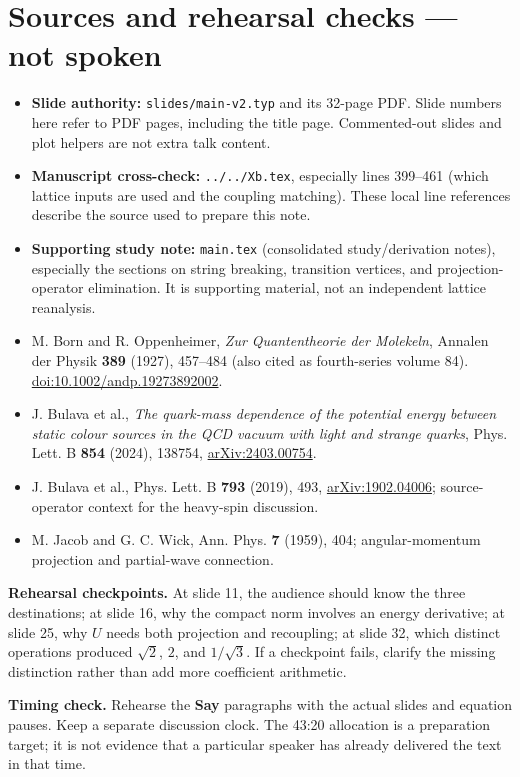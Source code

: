 \documentclass[11pt,a4paper]{article}
\begin{document}
\section*{Sources and rehearsal checks --- not spoken}
\begin{itemize}
\item \textbf{Slide authority:} \texttt{slides/main-v2.typ} and its 32-page
PDF. Slide numbers here refer to PDF pages, including the title page.
Commented-out slides and plot helpers are not extra talk content.
\item \textbf{Manuscript cross-check:} \texttt{../../Xb.tex}, especially
lines 399--461 (which lattice inputs are used and the coupling matching).
These local line references describe the source used to prepare this note.
\item \textbf{Supporting study note:} \texttt{main.tex} (consolidated study/derivation notes),
especially the sections on string breaking, transition vertices, and
projection-operator elimination. It is supporting material, not an
independent lattice reanalysis.
\item M. Born and R. Oppenheimer, \emph{Zur Quantentheorie der Molekeln},
Annalen der Physik \textbf{389} (1927), 457--484
(also cited as fourth-series volume 84).
\href{https://doi.org/10.1002/andp.19273892002}{doi:10.1002/andp.19273892002}.
\item J. Bulava et al., \emph{The quark-mass dependence of the potential
energy between static colour sources in the QCD vacuum with light and
strange quarks}, Phys. Lett. B \textbf{854} (2024), 138754,
\href{https://arxiv.org/abs/2403.00754}{arXiv:2403.00754}.
\item J. Bulava et al., Phys. Lett. B \textbf{793} (2019), 493,
\href{https://arxiv.org/abs/1902.04006}{arXiv:1902.04006}; source-operator
context for the heavy-spin discussion.
\item M. Jacob and G. C. Wick, Ann. Phys. \textbf{7} (1959), 404;
angular-momentum projection and partial-wave connection.
\end{itemize}

\textbf{Rehearsal checkpoints.} At slide 11, the audience should know the
three destinations; at slide 16, why the compact norm involves an energy
derivative; at slide 25, why $U$ needs both projection and recoupling;
at slide 32, which distinct operations produced $\sqrt2$, $2$, and
$1/\sqrt3$. If a checkpoint fails, clarify the missing distinction
rather than add more coefficient arithmetic.

\textbf{Timing check.} Rehearse the \textbf{Say} paragraphs with the actual
slides and equation pauses. Keep a separate discussion clock. The 43:20
allocation is a preparation target; it is not evidence that a particular
speaker has already delivered the text in that time.


\end{document}
